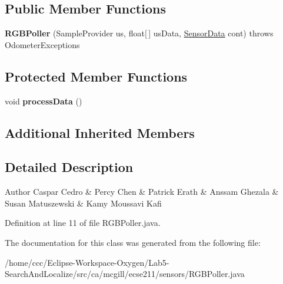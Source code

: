 \subsection*{Public Member Functions}
\begin{DoxyCompactItemize}
\item 
\mbox{\label{classca_1_1mcgill_1_1ecse211_1_1sensors_1_1_r_g_b_poller_aa0e804f9185cb172aa1f63c62d13d168}} 
{\bfseries R\+G\+B\+Poller} (Sample\+Provider us, float\mbox{[}$\,$\mbox{]} us\+Data, \hyperlink{classca_1_1mcgill_1_1ecse211_1_1sensors_1_1_sensor_data}{Sensor\+Data} cont)  throws Odometer\+Exceptions 
\end{DoxyCompactItemize}
\subsection*{Protected Member Functions}
\begin{DoxyCompactItemize}
\item 
\mbox{\label{classca_1_1mcgill_1_1ecse211_1_1sensors_1_1_r_g_b_poller_aa24f4b9ce7425a82fbee017619a49234}} 
void {\bfseries process\+Data} ()
\end{DoxyCompactItemize}
\subsection*{Additional Inherited Members}


\subsection{Detailed Description}
\begin{DoxyAuthor}{Author}
Caspar Cedro \& Percy Chen \& Patrick Erath \& Anssam Ghezala \& Susan Matuszewski \& Kamy Moussavi Kafi 
\end{DoxyAuthor}


Definition at line 11 of file R\+G\+B\+Poller.\+java.



The documentation for this class was generated from the following file\+:\begin{DoxyCompactItemize}
\item 
/home/ccc/\+Eclipse-\/\+Workspace-\/\+Oxygen/\+Lab5-\/\+Search\+And\+Localize/src/ca/mcgill/ecse211/sensors/R\+G\+B\+Poller.\+java\end{DoxyCompactItemize}
